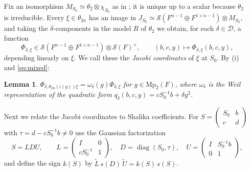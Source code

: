 \documentclass[11pt,oneside,notitlepage]{book}
\numberwithin{equation}{section}
\theoremstyle{plain}
\newtheorem{lemma}[theorem]{Lemma}
\theoremstyle{definition}
\newcommand{\Mp}{\mathrm{Mp}}
\newcommand{\cS}{\mathcal{S}}
\newcommand{\diag}{\operatorname{diag}}
\begin{document}
Fix an isomorphism $M_{S_0}\simeq\theta_2\otimes\chi_{S_0}$ as in ; it is unique up to a scalar because $\theta_2$ is irreducible. Every $\xi\in\theta_{2n}$ has an image in $J_{S_0}\simeq\cS(F^{n-1}\oplus F^{1\times n-1})\otimes M_{S_0}$, and taking the $\delta$-components in the model $R$ of $\theta_2$ we obtain, for each $\delta\in\mathcal D$, a function
\[\Phi_{\delta,\xi}\in\cS(F^{n-1}\oplus F^{1\times n-1})\otimes\cS(F)^+,\qquad(b,c,y)\mapsto\Phi_{\delta,\xi}(b,c,y),\]
depending linearly on $\xi$. We call these the \emph{Jacobi coordinates} of $\xi$ at $S_0$. By (i) and \eqref{eq:mixed}:

\begin{lemma}\label{lem:jacobi-action}
	$\Phi_{\delta,\theta_{2n}(\iota(g))\xi}=\omega_\delta(g)\Phi_{\delta,\xi}$ for $g\in\Mp_2(F)$, where $\omega_\delta$ is the Weil representation of the quadratic form $q_\delta(b,c,y)=cS_0^{-1}b+\delta y^2$.
\end{lemma}

Next we relate the Jacobi coordinates to Shalika coefficients. For $S=\left(\begin{smallmatrix}S_0&b\\c&d\end{smallmatrix}\right)$ with $\tau =d-cS_0^{-1}b\ne0$ use the Gaussian factorization
\[S=LDU,\qquad L=\begin{pmatrix}I&0\\cS_0^{-1}&1\end{pmatrix},\quad D=\diag(S_0,\tau ),\quad U=\begin{pmatrix}I&S_0^{-1}b\\0&1\end{pmatrix},\]
and define the sign $k(S)$ by $\tilde L\,s(D)\,\tilde U=k(S)\,s(S)$.
\end{document}
